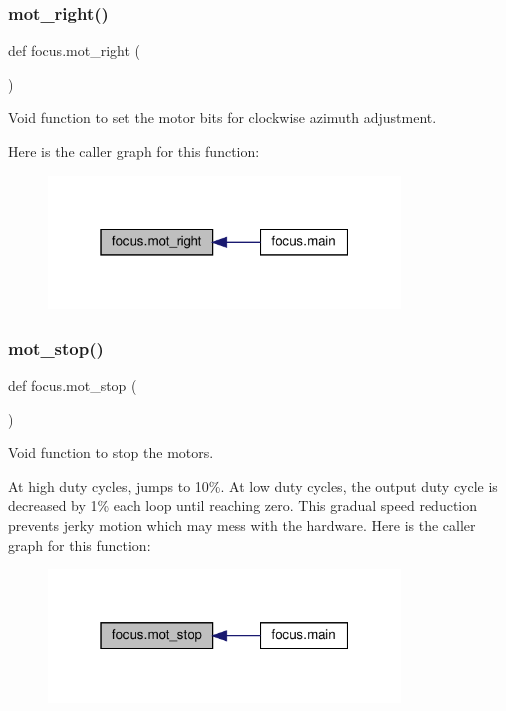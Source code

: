 \subsubsection{\texorpdfstring{mot\+\_\+right()}{mot\_right()}}
{\footnotesize\ttfamily def focus.\+mot\+\_\+right (\begin{DoxyParamCaption}{ }\end{DoxyParamCaption})}



Void function to set the motor bits for clockwise azimuth adjustment. 

Here is the caller graph for this function\+:
\nopagebreak
\begin{figure}[H]
\begin{center}
\leavevmode
\includegraphics[width=265pt]{namespacefocus_a9939d6f9388d8eb82625bd8e3af6f894_icgraph}
\end{center}
\end{figure}
\mbox{\label{namespacefocus_a19641d526d4c19ab6b10fc8ca9e8fe86}} 
\subsubsection{\texorpdfstring{mot\+\_\+stop()}{mot\_stop()}}
{\footnotesize\ttfamily def focus.\+mot\+\_\+stop (\begin{DoxyParamCaption}{ }\end{DoxyParamCaption})}



Void function to stop the motors. 

At high duty cycles, jumps to 10\%. At low duty cycles, the output duty cycle is decreased by 1\% each loop until reaching zero. This gradual speed reduction prevents jerky motion which may mess with the hardware. Here is the caller graph for this function\+:
\nopagebreak
\begin{figure}[H]
\begin{center}
\leavevmode
\includegraphics[width=265pt]{namespacefocus_a19641d526d4c19ab6b10fc8ca9e8fe86_icgraph}
\end{center}
\end{figure}
\mbox{\label{namespacefocus_ad0102bfe821a43392640e33721246a8c}} 
